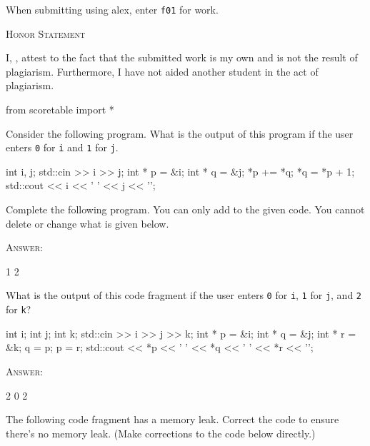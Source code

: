 

\renewcommand\AUTHOR{cadalebout1@cougars.ccis.edu} %


\topmattertwo

When submitting using alex, enter \verb!f01! for work.



\begin{center}
  \textsc{Honor Statement}
\end{center}
I, ,
attest to the fact that the submitted work is my own and
is not the result of plagiarism.
Furthermore, I have not aided another student in the act of
plagiarism.

\begin{python}
from scoretable import *
\end{python}
        
\newpage
\nextq
Consider the following program.
What is the output of this program if the user enters
\verb!0! for \verb!i! and \verb!1! for \verb!j!. 
\begin{console}
int i, j;
std::cin >> i >> j;
int * p = &i;
int * q = &j;
*p += *q;
*q = *p + 1;
std::cout << i << ' ' << j << '\n';
\end{console}
Complete the following program. You can only add to the given code.
You cannot delete or change what is given below.

\textsc{Answer:}
\begin{answercode}
1 2
\end{answercode}


\newpage
\nextq
What is the output of this code fragment
if the user enters \verb!0! for \verb!i!, \verb!1! for \verb!j!,
and \verb!2! for \verb!k!?
\begin{console}
int i;
int j;
int k;
std::cin >> i >> j >> k;
int * p = &i;
int * q = &j;
int * r = &k;
q = p;
p = r;
std::cout << *p << ' ' << *q << ' ' << *r << '\n'; 
\end{console}

\textsc{Answer:}
\begin{answercode}
2 0 2
\end{answercode}


\newpage
\nextq
The following code fragment has a memory leak.
Correct the code to ensure there's no memory leak.
(Make corrections to the code below directly.)

